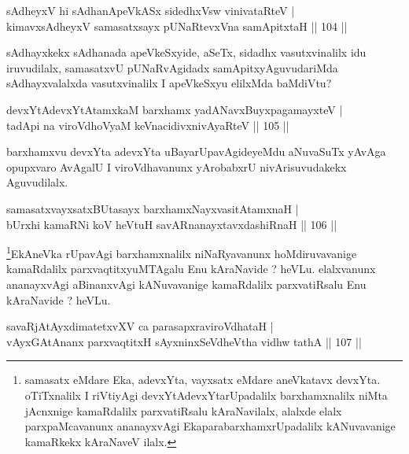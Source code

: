 \begin{shl}
sAdheyxV hi sAdhanApeVkASx sidedhxV\s sw vinivataRteV  | \\
kimavxsAdheyxV samasatxsayx pUNaRtevxVna samApitxtaH \hfill||  104 ||  
\end{shl}

\begin{artha}
sAdhayxkekx sAdhanada apeVkeSxyide, aSeTx, sidadhx vasutxvinalilx idu iruvudilalx, samasatxvU pUNaRvAgidadx samApitxyAguvudariMda sAdhayxvalalxda vasutxvinalilx I apeVkeSxyu elilxMda baMdiVtu?
\end{artha}

\begin{shl}
devxYtAdevxYtAtamxkaM barxhamx yadA\s NavxBuyxpagamayxteV   | \\
tadA\s pi na viroVdhoV\s yaM keVnacidivxnivAyaRteV \hfill||  105 ||  
\end{shl}

\begin{artha}
barxhamxvu devxYta adevxYta uBayarUpavAgideyeMdu aNuvaSuTx yAvAga opupxvaro AvAgalU I viroVdhavanunx yArobabxrU nivArisuvudakekx Aguvudilalx.
\end{artha}

\begin{shl}
samasatxvayxsatxBUtasayx barxhamxNayxvasitAtamxnaH  | \\
bUrxhi kamaRNi koV heVtuH savARnanayxtavxdashiRnaH \hfill||  106 ||  
\end{shl}

\begin{artha}
\footnote{samasatx eMdare Eka, adevxYta, vayxsatx eMdare aneVkatavx devxYta. oTiTxnalilx I riVtiyAgi devxYtAdevxYtarUpadalilx barxhamxnalilx niMta jAcnxnige kamaRdalilx parxvatiRsalu kAraNavilalx, alalxde elalx parxpaMcavanunx ananayxvAgi EkaparabarxhamxrUpadalilx kANuvavanige kamaRkekx kAraNaveV ilalx.}EkAneVka rUpavAgi barxhamxnalilx niNaRyavanunx hoMdiruvavanige kamaRdalilx parxvaqtitxyuMTAgalu Enu kAraNavide ? heVLu. elalxvanunx ananayxvAgi aBinanxvAgi kANuvavanige kamaRdalilx parxvatiRsalu Enu kAraNavide ? heVLu.
\end{artha}

\begin{shl}
savaRjAtAyxdimatetxvXV ca parasapxraviroVdhataH  | \\
vAyxGAtAnanx parxvaqtitxH sAyxninxSeVdheV\s tha vidhw tathA \hfill||  107 ||  
\end{shl}

